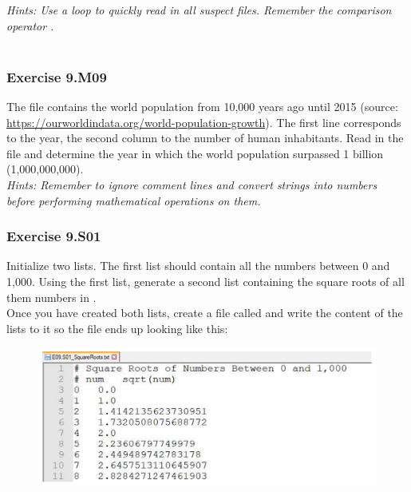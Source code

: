 \textit{Hints:
Use a loop to quickly read in all suspect files. Remember the comparison operator {\code{==}}.}\\[1cm]\\[1cm]


\subsubsection*{Exercise 9.M09}
The file {} contains the world population from 10,000
years ago until 2015 (source: \url{https://ourworldindata.org/world-population-growth}). The
first line corresponds to the year, the second column to the number of human inhabitants.
Read in the file and determine the year in which the world population surpassed 1 billion
(1,000,000,000).\\

\textit{Hints:
Remember to ignore comment lines and convert strings into numbers before performing
mathematical operations on them.}\\[1cm]


\subsubsection*{Exercise 9.S01}
Initialize two lists. The first list {} should contain all the numbers between 0 and 1,000. Using the first list, generate a second list {} containing the square roots of all them numbers in {}.\\
Once you have created both lists, create a file called {} and
write the content of the lists to it so the file ends up looking like this:
\begin{figure}[H]
		\centering
		\includegraphics[width=\textwidth]{../IMG/9S01.png} 
\end{figure}

